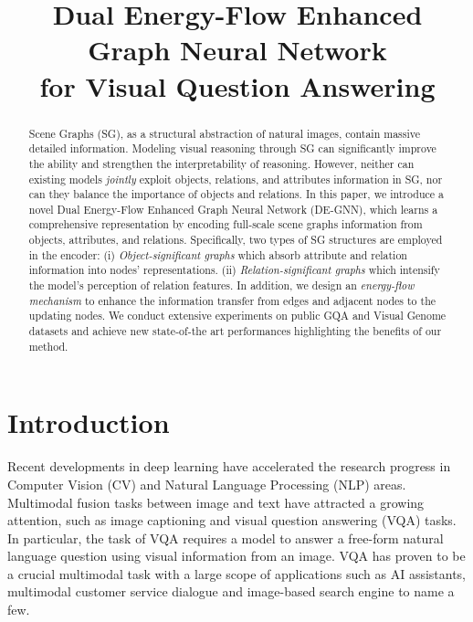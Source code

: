 \documentclass[letterpaper]{article} %
\title{Dual Energy-Flow Enhanced Graph Neural Network\\ for Visual Question Answering}
\begin{document}
\maketitle

\begin{abstract}
Scene Graphs (SG), as a structural abstraction of natural images, contain massive detailed information. 
Modeling visual reasoning through SG can significantly improve the ability and strengthen the interpretability of reasoning. 
However, neither can existing models \emph{jointly} exploit objects, relations, and attributes information in SG, nor can they balance the importance of objects and relations. 
In this paper, we introduce a novel Dual Energy-Flow Enhanced Graph Neural Network (DE-GNN), which learns a comprehensive representation by encoding full-scale scene graphs information from objects, attributes, and relations.
Specifically, two types of SG structures are employed in the encoder: 
(i) \textit{Object-significant graphs} which absorb attribute and relation information into nodes' representations. 
(ii) \textit{Relation-significant graphs} which intensify the model's perception of relation features. 
In addition, we design an \textit{energy-flow mechanism} to enhance the information transfer from edges and adjacent nodes to the updating nodes. 
We conduct extensive experiments on public GQA and Visual Genome datasets and achieve new state-of-the art performances highlighting the benefits of our method. 
\end{abstract}

\section{Introduction}
Recent developments in deep learning have accelerated the research progress in Computer Vision (CV) and Natural Language Processing (NLP) areas. 
Multimodal fusion tasks between image and text have attracted a growing attention, such as image captioning and visual question answering (VQA) tasks. 
In particular, the task of VQA requires a model to answer a free-form natural language question using visual information from an image. 
VQA has proven to be a crucial multimodal task with a large scope of applications such as AI assistants, multimodal customer service dialogue and image-based search engine to name a few.
\end{document}
